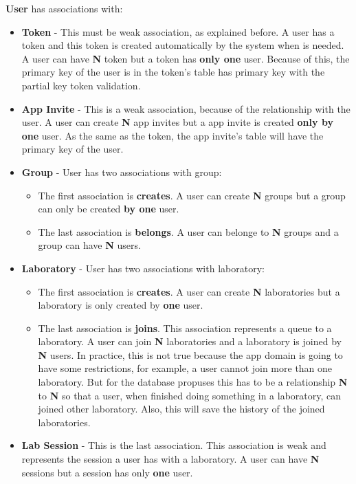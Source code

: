\documentclass[a4paper,twoside,11pt]{article}
\begin{document}
\textbf{User} has associations with:
\begin{itemize}
    \item \textbf{Token} - This must be weak association, as explained before. A user has a token and this token is created automatically by the system when is needed. A user can have \textbf{N} token but a token has \textbf{only one} user.
                           Because of this, the primary key of the user is in the token's table has primary key with the partial key token validation. 
    \item \textbf{App Invite} - This is a weak association, because of the relationship with the user. A user can create \textbf{N} app invites but a app invite is created \textbf{only by one} user. As the same as the token, the app invite's table will have the primary key of the user.
    \item \textbf{Group} - User has two associations with group:
    \begin{itemize}
        \item The first association is \textbf{creates}. A user can create \textbf{N} groups but a group can only be created \textbf{by one} user.
        \item The last association is \textbf{belongs}. A user can belonge to \textbf{N} groups and a group can have \textbf{N} users.
    \end{itemize}
    \item \textbf{Laboratory} - User has two associations with laboratory:
    \begin{itemize}
        \item The first association is \textbf{creates}. A user can create \textbf{N} laboratories but a laboratory is only created by \textbf{one} user. 
        \item The last association is \textbf{joins}. This association represents a queue to a laboratory. A user can join \textbf{N} laboratories and a laboratory is joined by \textbf{N} users. In practice, this is not true because the app domain is going to have some restrictions, for example, a user cannot join more than one laboratory. But for the database propuses this has to be a relationship \textbf{N} to \textbf{N} so that a user, when finished doing something in a laboratory, can joined other laboratory. Also, this will save the history of the joined laboratories. 
    \end{itemize}
    \item \textbf{Lab Session} - This is the last association. This association is weak and represents the session a user has with a laboratory. A user can have \textbf{N} sessions but a session has only \textbf{one} user.
\end{itemize}
\end{document}
